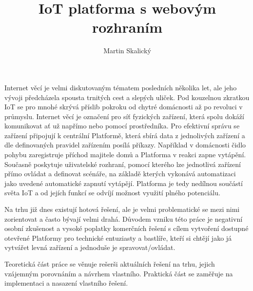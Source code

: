 \documentclass[thesis=B,czech]{FITthesis}[2019/12/23]
\title{IoT platforma s webovým rozhraním}
\author{Martin Skalický} %
\begin{document}

\begin{introduction}

    Internet věcí je velmi diskutovaným tématem posledních několika let, ale jeho vývoji předcházela spousta trnitých cest a slepých uliček. Pod kouzelnou zkratkou IoT se pro mnohé skrývá příslib pokroku od chytré domácnosti až po revoluci v průmyslu. Internet věcí je označení pro síť fyzických zařízení, která spolu dokáží komunikovat ať už napřímo nebo pomocí prostředníka. Pro efektivní správu se zařízení připojují k centrální Platformě, která sbírá data z jednolivých zařízení a dle definovaných pravidel zařízením posílá příkazy. Například v domácnosti čidlo pohybu zaregistruje příchod majitele domů a Platforma v reakci zapne vytápění. Současně poskytuje uživatelské rozhraní, pomocí kterého lze jednotlivá zařízení přímo ovládat a definovat scénáře, na základě kterých vykonává automatizaci jako uvedené automatické zapnutí vytápějí. Platforma je tedy nedílnou součástí světa IoT a od jejích funkcí se odvíjí možnost využití plného potenciálu.

    Na trhu již dnes existují hotová řešení, ale je velmi problematické se mezi nimi zorientovat a často bývají velmi drahá. Důvodem vzniku této práce je negativní osobní zkušenost a vysoké poplatky komerčních řešení s cílem vytvoření dostupné otevřené Platformy pro technické entuziasty a bastlíře, kteří si chtějí jako já vytvářet levná zařízení a jednoduše je spravovat/ovládat.

    Teoretická část práce se věnuje rešerši aktuálních řešení na trhu, jejich vzájemným porovnáním a návrhem vlastního. Praktická část se zaměřuje na implementaci a nasazení vlastního řešení.




\end{introduction}
\end{document}
